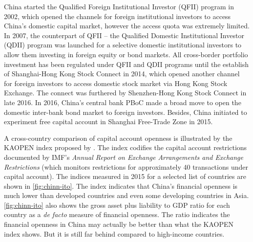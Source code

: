 \documentclass[AER]{AEA}
\begin{document}
China started the Qualified Foreign Institutional Investor (QFII) program in 2002, 
which opened the channels for foreign institutional investors to access
China's domestic capital market, however the access quota was extremely limited.
In 2007, the counterpart of QFII -- the Qualified Domestic Institutional Investor (QDII)
program was launched for a selective domestic institutional investors to allow
them investing in foreign equity or bond markets. All cross-border portfolio
investment has been regulated under QFII and QDII programs until the establish
of Shanghai-Hong Kong Stock Connect in 2014, which opened another channel for
foreign investors to access domestic stock market via Hong Kong Stock Exchange.
The connect was furthered by Shenzhen-Hong Kong Stock Connect in late 2016. In
2016, China's central bank PBoC made a broad move to open the domestic
inter-bank bond market to foreign investors. Besides, China initiated to
experiment free capital account in Shanghai Free-Trade Zone in 2015. 

A cross-country comparison of capital account openness is illustrated by
the KAOPEN index proposed by \cite{chinn2008}. The index codifies the capital
account restrictions documented by IMF’s \textit{Annual Report on Exchange
Arrangements and Exchange Restrictions} (which monitors restrictions for
approximately 40 transactions under capital account). 
The indices measured in 2015 for a selected list of countries are shown 
in \autoref{fig:chinn-ito}. 
The index indicates that China's financial openness is much lower than 
developed countries and even some developing countries in Asia.
\autoref{fig:chinn-ito} also shows the gross asset plus liability to GDP ratio 
for each country as a \textit{de facto} measure of financial openness. 
The ratio indicates the financial openness in China may actually be better than 
what the KAOPEN index shows. But it is still far behind compared to high-income 
countries.
\end{document}
